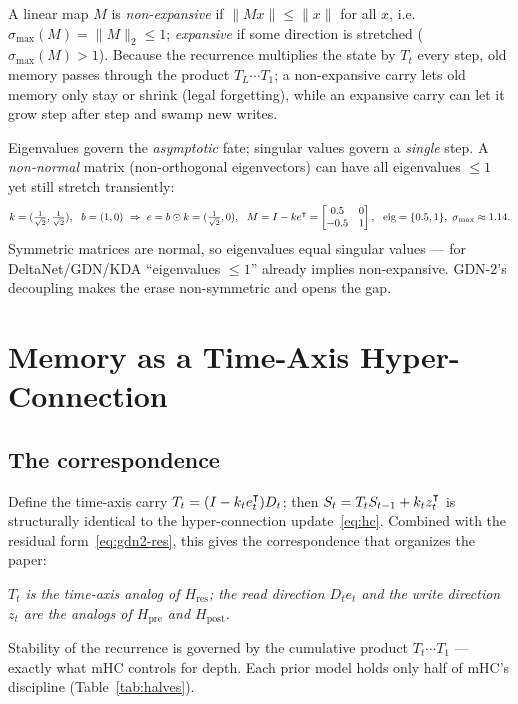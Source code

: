 \documentclass[11pt,letterpaper,logo]{yalearxiv}
\newcommand{\smax}{\sigma_{\max}}
\newcommand{\Tcarry}{T}                        %
\newcommand{\Hres}{H_{\mathrm{res}}}
\newcommand{\Hpre}{H_{\mathrm{pre}}}
\newcommand{\Hpost}{H_{\mathrm{post}}}
\begin{document}
A linear map $M$ is \emph{non-expansive} if $\|Mx\| \le \|x\|$ for all $x$, i.e.\
$\smax(M) = \|M\|_2 \le 1$; \emph{expansive} if some direction is stretched
($\smax(M) > 1$). Because the recurrence multiplies the state by $\Tcarry_t$ every step,
old memory passes through the product $\Tcarry_L \cdots \Tcarry_1$; a non-expansive carry
lets old memory only stay or shrink (legal forgetting), while an expansive carry can let it
grow step after step and swamp new writes.

Eigenvalues govern the \emph{asymptotic} fate; singular values govern a \emph{single} step.
A \emph{non-normal} matrix (non-orthogonal eigenvectors) can have all eigenvalues $\le 1$
yet still stretch transiently:
\begin{equation}
  k=(\tfrac1{\sqrt2},\tfrac1{\sqrt2}),\ \ b=(1,0)
  \ \Rightarrow\ e = b\odot k = (\tfrac1{\sqrt2},0),\ \
  M = I - k e^{\tr} = \begin{bmatrix} 0.5 & 0\\ -0.5 & 1\end{bmatrix},\ \
  \text{eig}=\{0.5,1\},\ \smax\approx 1.14 .
  \label{eq:nonnormal-ex}
\end{equation}
Symmetric matrices are normal, so eigenvalues equal singular values --- for DeltaNet/GDN/KDA
``eigenvalues $\le 1$'' already implies non-expansive. GDN-2's decoupling makes the erase
non-symmetric and opens the gap.


\section{Memory as a Time-Axis Hyper-Connection}
\label{sec:view}

\subsection{The correspondence}
Define the time-axis carry $\Tcarry_t = (I - k_t e_t^{\tr}) D_t$; then
$S_t = \Tcarry_t S_{t-1} + k_t z_t^{\tr}$ is structurally identical to the
hyper-connection update~\eqref{eq:hc}. Combined with the residual
form~\eqref{eq:gdn2-res}, this gives the correspondence that organizes the paper:
\begin{center}
\emph{$\Tcarry_t$ is the time-axis analog of $\Hres$; the read direction $D_t e_t$ and the
write direction $z_t$ are the analogs of $\Hpre$ and $\Hpost$.}
\end{center}
Stability of the recurrence is governed by the cumulative product
$\Tcarry_t \cdots \Tcarry_1$ --- exactly what mHC controls for depth. Each prior model
holds only half of mHC's discipline (Table~\ref{tab:halves}).
\end{document}
